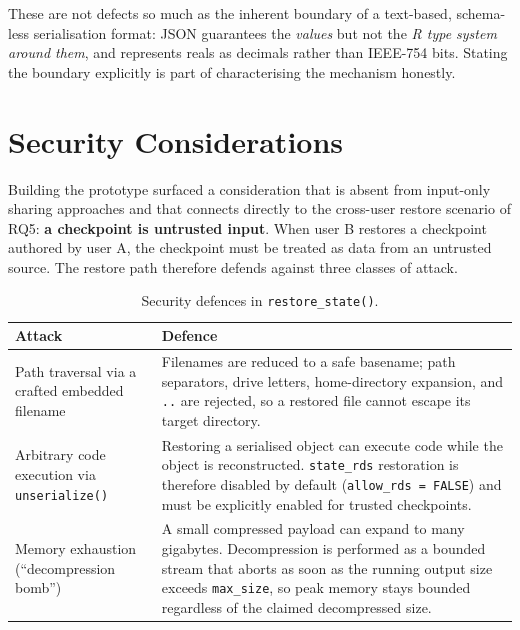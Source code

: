 \documentclass[11pt,a4paper]{article}
\begin{document}
These are not defects so much as the inherent boundary of a text-based,
schema-less serialisation format: JSON guarantees the \emph{values} but not the
\emph{R type system around them}, and represents reals as decimals rather than
IEEE-754 bits. Stating the boundary explicitly is part of characterising the
mechanism honestly.

\section{Security Considerations}

Building the prototype surfaced a consideration that is absent from input-only
sharing approaches and that connects directly to the cross-user restore scenario
of RQ5: \textbf{a checkpoint is untrusted input}. When user B restores a
checkpoint authored by user A, the checkpoint must be treated as data from an
untrusted source. The restore path therefore defends against three classes of
attack.

\begin{table}[h]
\centering
\begin{tabularx}{\textwidth}{lX}
\toprule
\textbf{Attack} & \textbf{Defence} \\
\midrule
Path traversal via a crafted embedded filename
  & Filenames are reduced to a safe basename; path separators, drive letters,
    home-directory expansion, and \texttt{..} are rejected, so a restored file
    cannot escape its target directory. \\[4pt]
Arbitrary code execution via \texttt{unserialize()}
  & Restoring a serialised object can execute code while the object is
    reconstructed. \texttt{state\_rds} restoration is therefore disabled by
    default (\texttt{allow\_rds = FALSE}) and must be explicitly enabled for
    trusted checkpoints. \\[4pt]
Memory exhaustion (``decompression bomb'')
  & A small compressed payload can expand to many gigabytes. Decompression is
    performed as a bounded stream that aborts as soon as the running output size
    exceeds \texttt{max\_size}, so peak memory stays bounded regardless of the
    claimed decompressed size. \\
\bottomrule
\end{tabularx}
\caption{Security defences in \texttt{restore\_state()}.}
\end{table}
\end{document}
